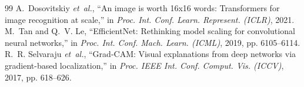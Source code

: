 \documentclass[journal]{IEEEtran}
\begin{document}
\begin{thebibliography}{99}
A.~Dosovitskiy \emph{et~al.}, ``An image is worth 16x16 words: Transformers for image recognition at scale,'' in \emph{Proc. Int. Conf. Learn. Represent. (ICLR)}, 2021.
M.~Tan and Q.~V. Le, ``EfficientNet: Rethinking model scaling for convolutional neural networks,'' in \emph{Proc. Int. Conf. Mach. Learn. (ICML)}, 2019, pp. 6105--6114.
R.~R. Selvaraju \emph{et~al.}, ``Grad-CAM: Visual explanations from deep networks via gradient-based localization,'' in \emph{Proc. IEEE Int. Conf. Comput. Vis. (ICCV)}, 2017, pp. 618--626.
\end{thebibliography}
\end{document}
